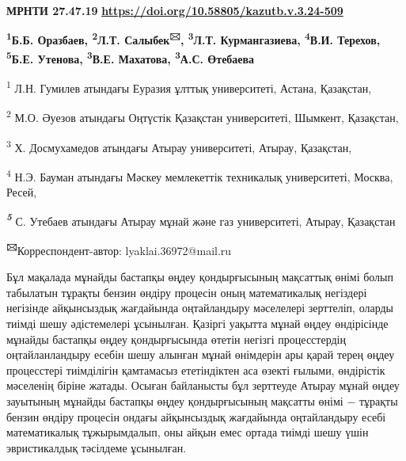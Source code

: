 \newpage
{\bfseries МРНТИ 27.47.19}
\hfill {\bfseries \href{https://doi.org/10.58805/kazutb.v.3.24-509}{https://doi.org/10.58805/kazutb.v.3.24-509}}


\begin{center}
{\bfseries \textsuperscript{1}Б.Б. Оразбаев, \textsuperscript{2}Л.Т.
Салыбек\textsuperscript{🖂}, \textsuperscript{3}Л.Т. Курмангазиева,
\textsuperscript{4}В.И. Терехов, \textsuperscript{5}Б.Е. Утенова, \textsuperscript{3}В.Е. Махатова, \textsuperscript{3}А.С.
Өтебаева}

\textsuperscript{1} Л.Н. Гумилев атындағы Еуразия ұлттық университеті,
Астана, Қазақстан,

\textsuperscript{2} М.О. Әуезов атындағы Оңтүстік Қазақстан
университеті, Шымкент, Қазақстан,

\textsuperscript{3} Х. Досмухамедов атындағы Атырау университеті,
Атырау, Қазақстан,

\textsuperscript{4} Н.Э. Бауман атындағы Мәскеу мемлекеттік техникалық
университеті, Москва, Ресей,

\emph{{\bfseries \textsuperscript{5}}} С. Утебаев атындағы Атырау мұнай
және газ университеті, Атырау, Қазақстан

{\bfseries \textsuperscript{🖂}}Корреспондент-автор: lyaklai.36972@mail.ru \vspace{0.5cm}

\end{center}
Бұл мақалада мұнайды бастапқы өңдеу қондырғысының мақсаттық өнімі болып
табылатын тұрақты бензин өндіру процесін оның математикалық негіздері
негізінде айқынсыздық жағдайында оңтайландыру мәселелері зерттеліп,
оларды тиімді шешу әдістемелері ұсынылған. Қазіргі уақытта мұнай өңдеу
өндірісінде мұнайды бастапқы өңдеу қондырғысында өтетін негізгі
процесстердің оңтайланландыру есебін шешу алынған мұнай өнімдерін ары
қарай терең өңдеу процесстері тиімділігін қамтамасыз ететіндіктен аса
өзекті ғылыми, өндірістік мәселенің біріне жатады. Осыған байланысты бұл
зерттеуде Атырау мұнай өңдеу зауытының мұнайды бастапқы өңдеу
қондырғысының мақсатты өнімі − тұрақты бензин өндіру процесін ондағы
айқынсыздық жағдайында оңтайландыру есебі математикалық тұжырымдалып,
оны айқын емес ортада тиімді шешу үшін эвристикалдық тәсілдеме
ұсынылған.

